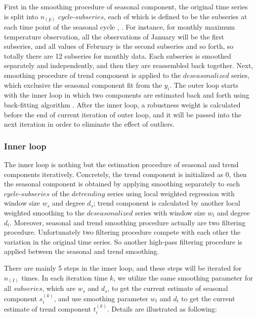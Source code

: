 First in the smoothing procedure of seasonal component, the original time series 
is split into $n_{(p)}$ $cycle$-$subseries$, each of which is defined to be 
the subseries at each time point of the seasonal cycle \cite{hafen2010local}, 
\cite{Cleveland:1990}. For instance, for monthly maximum temperature 
observation, all the observations of January will be the first subseries, and
all values of February is the second subseries and so forth, so totally there are 
12 subseries for monthly data. Each subseries is smoothed separately and 
independently, and then they are reassembled back together. Next, smoothing 
procedure of trend component is applied to the $deseasonalized$ series, which 
exclusive the seasonal component fit from the $y_i$. The outer loop starts with 
the inner loop in which two components are estimated back and forth using 
back-fitting algorithm \cite{breiman1985estimating}. After the inner loop, a 
robustness weight is calculated before the end of current iteration of outer 
loop, and it will be passed into the next iteration in order to eliminate the 
effect of outliers.

\subsubsection{Inner loop}

The inner loop is nothing but the estimation procedure of seasonal and trend
components iteratively. Concretely, the trend component is initialized as 0, then 
the seasonal component is obtained by applying smoothing separately to each 
$cycle$-$subseries$ of the $detrending$ series using local weighted regression 
with window size $w_s$ and degree $d_s$; trend component is calculated by another 
local weighted smoothing to the $deseasonalized$ series with window size $w_t$ 
and degree $d_t$. Moreover, seasonal and trend smoothing procedure actually are 
two filtering procedure. Unfortunately two filtering procedure compete with each 
other the variation in the original time series. So another high-pass filtering 
procedure is applied between the seasonal and trend smoothing.

There are mainly 5 steps in the inner loop, and these steps will be iterated for
$n_{(I)}$ times. In each iteration time $k$, we utilize the same smoothing 
parameter for all $subseries$, which are $w_s$ and $d_s$, to get the current 
estimate of seasonal component $s_i^{(k)}$, and use smoothing parameter $w_t$ and 
$d_t$ to get the current estimate of trend component $t_i^{(k)}$. Details are 
illustrated as following:

